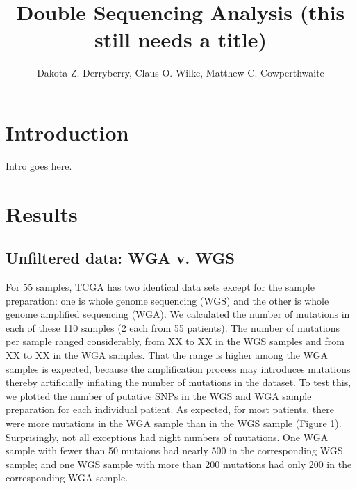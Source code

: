 \documentclass[11pt]{article} %
\title{Double Sequencing Analysis (this still needs a title)}
\author{Dakota Z. Derryberry, Claus O. Wilke, Matthew C. Cowperthwaite}
\begin{document}
\maketitle

\section{Introduction}

Intro goes here.

\section{Results}

\subsection{Unfiltered data: WGA v. WGS}

For 55 samples, TCGA has two identical data sets except for the sample preparation: one is whole genome sequencing (WGS) and the other is whole genome amplified sequencing (WGA). We calculated the number of mutations in each of these 110 samples (2 each from 55 patients). The number of mutations per sample ranged considerably, from XX to XX in the WGS samples and from XX to XX in the WGA samples. That the range is higher among the WGA samples is expected, because the amplification process may introduces mutations thereby artificially inflating the number of mutations in the dataset. To test this, we plotted the number of putative SNPs in the WGS and WGA sample preparation for each individual patient. As expected, for most patients, there were more mutations in the WGA sample than in the WGS sample (Figure 1). Surprisingly, not all exceptions had night numbers of mutations. One WGA sample with fewer than 50 mutaions had nearly 500 in the corresponding WGS sample; and one WGS sample with more than 200 mutations had only 200 in the corresponding WGA sample.
\end{document}
